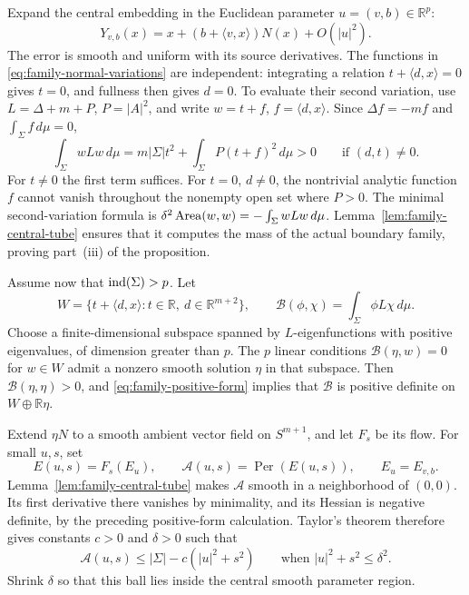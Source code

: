 Expand the central embedding in the Euclidean parameter
$u=(v,b)\in\mathbb R^p$:
\begin{equation}\label{eq:family-first-variation}
 Y_{v,b}(x)=x+(b+\langle v,x\rangle)N(x)+O(|u|^2).
\end{equation}
The error is smooth and uniform with its source derivatives.
The functions in \eqref{eq:family-normal-variations} are independent:
integrating a relation $t+\langle d,x\rangle=0$ gives $t=0$, and
fullness then gives $d=0$.
To evaluate their second variation, use $L=\Delta+m+P$, $P=|A|^2$,
and write $w=t+f$, $f=\langle d,x\rangle$.
Since $\Delta f=-mf$ and $\int_\Sigma f\,d\mu=0$,
\begin{equation}\label{eq:family-positive-form}
 \int_\Sigma wLw\,d\mu
   =m|\Sigma|t^2+\int_\Sigma P(t+f)^2\,d\mu>0
 \qquad\text{if }(d,t)\ne0.
\end{equation}
For $t\ne0$ the first term suffices.  For $t=0$, $d\ne0$, the
nontrivial analytic function $f$ cannot vanish throughout the nonempty
open set where $P>0$.
The minimal second-variation formula is
$\delta^2\operatorname{Area}(w,w)=-\int_\Sigma wLw\,d\mu$.
Lemma~\ref{lem:family-central-tube} ensures that it computes the mass
of the actual boundary family, proving part~\textup{(iii)} of the
proposition.

Assume now that $\operatorname{ind}(\Sigma)>p$.  Let
\[
 W=\{t+\langle d,x\rangle:t\in\mathbb R,\ d\in\mathbb R^{m+2}\},
 \qquad
 \mathcal B(\phi,\chi)=\int_\Sigma\phi L\chi\,d\mu.
\]
Choose a finite-dimensional subspace spanned by $L$-eigenfunctions
with positive eigenvalues, of dimension greater than $p$.
The $p$ linear conditions
$\mathcal B(\eta,w)=0$ for $w\in W$ admit a nonzero smooth solution
$\eta$ in that subspace.  Then $\mathcal B(\eta,\eta)>0$, and
\eqref{eq:family-positive-form} implies that $\mathcal B$ is positive
definite on $W\oplus\mathbb R\eta$.

Extend $\eta N$ to a smooth ambient vector field on $S^{m+1}$, and
let $F_s$ be its flow.  For small $u,s$, set
\[
 E(u,s)=F_s(E_u),\qquad
 \mathcal A(u,s)=\operatorname{Per}(E(u,s)),
 \qquad E_u=E_{v,b}.
\]
Lemma~\ref{lem:family-central-tube} makes $\mathcal A$ smooth in a neighborhood
of $(0,0)$.  Its first derivative there vanishes by minimality, and
its Hessian is negative definite, by the preceding positive-form
calculation.  Taylor's theorem therefore gives constants $c>0$ and
$\delta>0$ such that
\begin{equation}\label{eq:family-morse-estimate}
 \mathcal A(u,s)\le|\Sigma|-c(|u|^2+s^2)
 \qquad\text{when }|u|^2+s^2\le\delta^2.
\end{equation}
Shrink $\delta$ so that this ball lies inside the central smooth
parameter region.

